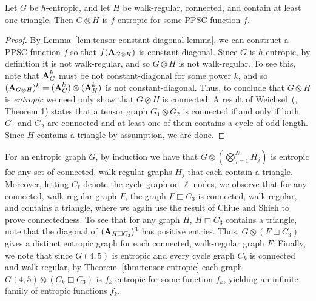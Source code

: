 \begin{theorem}\label{thm:tensor-entropic}
      Let $G$ be $h$-entropic, and let $H$ be walk-regular, connected, and contain at least one triangle.
      Then $G \otimes H$ is $f$-entropic for some PPSC function $f$.
\end{theorem}
\begin{proof}
    By Lemma~\ref{lem:tensor-constant-diagonal-lemma},
    we can construct a PPSC function $f$ so that $f(\textbf{A}_{G \otimes H})$ is constant-diagonal.
    Since $G$ is $h$-entropic, by definition it is not walk-regular,
    and so $G\otimes H$ is not walk-regular.
    To see this, note that $\textbf{A}_G^k$ must be not constant-diagonal for some power $k$, and so $(\textbf{A}_{G\otimes H})^k = (\textbf{A}_G^k)\otimes(\textbf{A}_{H}^k)$ is not constant-diagonal.
    Thus, to conclude that $G \otimes H$ is \emph{entropic} we need only show that $G \otimes H$ is connected.
    A result of Weichsel~(\cite{weichsel1962kronecker}, Theorem 1) states that a tensor graph $G_1 \otimes G_2$ is connected if and only if both $G_1$ and $G_2$ are connected and at least one of them contains a cycle of odd length.
    Since $H$ contains a triangle by assumption, we are done.
\end{proof}

For an entropic graph $G$, by induction we have that $G \otimes \left( \bigotimes_{j=1}^N H_j \right)$ is entropic for any set of connected, walk-regular graphs $H_j$ that each contain a triangle.
Moreover, letting $C_{\ell}$ denote the cycle graph on $\ell$ nodes,
we observe that for any connected, walk-regular graph $F$,
the graph $F \Box C_3$ is connected, walk-regular, and contains a triangle, where we again use
the result of Chiue and Shieh to prove connectedness.
To see that for any graph $H$, $H \Box C_3$ contains a triangle, note that the diagonal of $(\textbf{A}_{H \Box C_3})^3$ has positive entries.
Thus, $G \otimes (F \Box C_3)$ gives a distinct entropic graph for each connected, walk-regular graph $F$.
Finally, we note that since $G(4,5)$ is entropic and every cycle graph $C_k$ is connected and walk-regular, by Theorem~\ref{thm:tensor-entropic} each graph $G(4,5) \otimes (C_k \Box C_3)$ is $f_k$-entropic for some function $f_k$, yielding an infinite family of entropic functions $f_k$.
